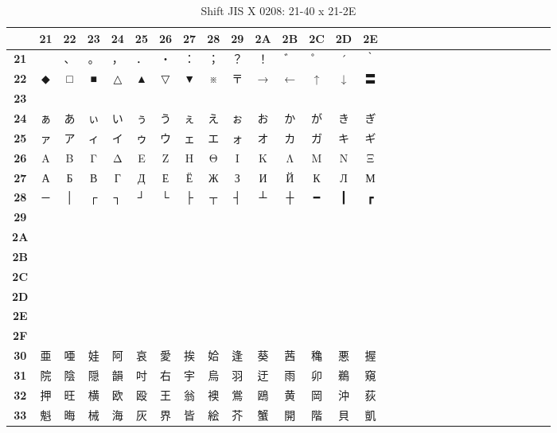 \begin{table}[H]
\centering
\caption{Shift JIS X 0208: 21-40 x 21-2E}
\begin{tabular}{|Sc|Sc|Sc|Sc|Sc|Sc|Sc|Sc|Sc|Sc|Sc|Sc|Sc|Sc|Sc|}
\hline
 & \textbf{21} & \textbf{22} & \textbf{23} & \textbf{24} & \textbf{25} & \textbf{26} & \textbf{27} & \textbf{28} & \textbf{29} & \textbf{2A} & \textbf{2B} & \textbf{2C} & \textbf{2D} & \textbf{2E} \\ \hline
\textbf{21} &   & 、 & 。 & ， & ． & ・ & ： & ； & ？ & ！ & ゛ & ゜ & ´ & ｀ \\ \hline
\textbf{22} & ◆ & □ & ■ & △ & ▲ & ▽ & ▼ & ※ & 〒 & → & ← & ↑ & ↓ & 〓 \\ \hline
\textbf{23} &   &   &   &   &   &   &   &   &   &   &   &   &   &   \\ \hline
\textbf{24} & ぁ & あ & ぃ & い & ぅ & う & ぇ & え & ぉ & お & か & が & き & ぎ \\ \hline
\textbf{25} & ァ & ア & ィ & イ & ゥ & ウ & ェ & エ & ォ & オ & カ & ガ & キ & ギ \\ \hline
\textbf{26} & Α & Β & Γ & Δ & Ε & Ζ & Η & Θ & Ι & Κ & Λ & Μ & Ν & Ξ \\ \hline
\textbf{27} & А & Б & В & Г & Д & Е & Ё & Ж & З & И & Й & К & Л & М \\ \hline
\textbf{28} & ─ & │ & ┌ & ┐ & ┘ & └ & ├ & ┬ & ┤ & ┴ & ┼ & ━ & ┃ & ┏ \\ \hline
\textbf{29} &  &  &  &  &  &  &  &  &  &  &  &  &  &  \\ \hline
\textbf{2A} &  &  &  &  &  &  &  &  &  &  &  &  &  &  \\ \hline
\textbf{2B} &  &  &  &  &  &  &  &  &  &  &  &  &  &  \\ \hline
\textbf{2C} &  &  &  &  &  &  &  &  &  &  &  &  &  &  \\ \hline
\textbf{2D} &  &  &  &  &  &  &  &  &  &  &  &  &  &  \\ \hline
\textbf{2E} &  &  &  &  &  &  &  &  &  &  &  &  &  &  \\ \hline
\textbf{2F} &  &  &  &  &  &  &  &  &  &  &  &  &  &  \\ \hline
\textbf{30} & 亜 & 唖 & 娃 & 阿 & 哀 & 愛 & 挨 & 姶 & 逢 & 葵 & 茜 & 穐 & 悪 & 握 \\ \hline
\textbf{31} & 院 & 陰 & 隠 & 韻 & 吋 & 右 & 宇 & 烏 & 羽 & 迂 & 雨 & 卯 & 鵜 & 窺 \\ \hline
\textbf{32} & 押 & 旺 & 横 & 欧 & 殴 & 王 & 翁 & 襖 & 鴬 & 鴎 & 黄 & 岡 & 沖 & 荻 \\ \hline
\textbf{33} & 魁 & 晦 & 械 & 海 & 灰 & 界 & 皆 & 絵 & 芥 & 蟹 & 開 & 階 & 貝 & 凱 \\ \hline

\end{tabular}
\end{table}
